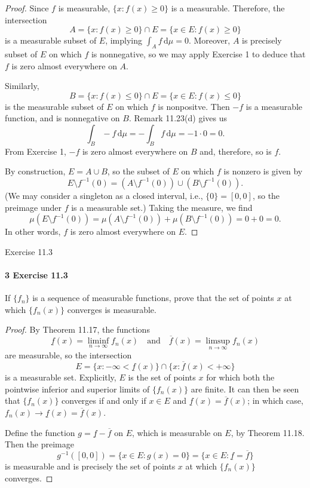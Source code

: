 \documentclass[12pt]{article}
\newenvironment{fullbox}{\begin{lrbox}{\savefullbox}\begin{minipage}{\dimexpr\textwidth-2\fboxsep\relax}}{\end{minipage}\end{lrbox}\begin{center}\framebox[\textwidth]{\usebox{\savefullbox}}\end{center}}
\newenvironment{pbox}[1][]{\begin{fullbox}\ifx#1\empty\else\paragraph{#1}\fi}{\end{fullbox}}
\newcommand{\isp}[1]{\quad\text{#1}\quad}
\newcommand{\<}{\langle}
\renewcommand{\>}{\rangle}
\newcommand{\dd}[1]{\,\mathrm{d}#1}
\newcommand{\of}[1]{\!\left(#1\right)}
\begin{document}
\begin{proof}
    Since $f$ is measurable, $\{x : f(x) \geq 0\}$ is a measurable. Therefore, the intersection
    \[
        A = \{x : f(x) \geq 0\} \cap E = \{x \in E : f(x) \geq 0\}
    \]
    is a measurable subset of $E$, implying $\int_A f \dd{\mu} = 0$. Moreover, $A$ is precisely subset of $E$ on which $f$ is nonnegative, so we may apply Exercise 1 to deduce that $f$ is zero almost everywhere on $A$.

    Similarly,
    \[
        B = \{x : f(x) \leq 0\} \cap E = \{x \in E : f(x) \leq 0\}
    \]
    is the measurable subset of $E$ on which $f$ is nonpositve. Then $-f$ is a measurable function, and is nonnegative on $B$. Remark 11.23(d) gives us
    \[
        \int_B -f \dd{\mu} = - \int_B f \dd{\mu} = -1 \cdot 0 = 0.
    \]
    From Exercise 1, $-f$ is zero almost everywhere on $B$ and, therefore, so is $f$. 
    
    By construction, $E = A \cup B$, so the subset of $E$ on which $f$ is nonzero is given by
    \[
        E \setminus f^{-1}(0) = (A \setminus f^{-1}(0)) \cup (B \setminus f^{-1}(0)).
    \]
    (We may consider a singleton as a closed interval, i.e., $\{0\} = [0, 0]$, so the preimage under $f$ is a measurable set.) Taking the measure, we find
    \[
        \mu\of{E \setminus f^{-1}(0)}
            = \mu\of{A \setminus f^{-1}(0)} + \mu\of{B \setminus f^{-1}(0)}
            = 0 + 0
            = 0.
    \]
    In other words, $f$ is zero almost everywhere on $E$.

\end{proof}


\newpage
\begin{pbox}[3 Exercise 11.3]
    If $\{f_n\}$ is a sequence of measurable functions, prove that the set of points $x$ at which $\{f_n(x)\}$ converges is measurable.
\end{pbox}

\begin{proof}
    By Theorem 11.17, the functions
    \[
        \underline{f}(x) = \liminf_{n \to \infty} f_n(x)
        \isp{and}    
        \overline{f}(x) = \limsup_{n \to \infty} f_n(x) 
    \]
    are measurable, so the intersection 
    \[
        E = \{x : -\infty < \underline{f}(x)\} \cap \{x : \overline{f}(x) < +\infty\}
    \]
    is a measurable set. Explicitly, $E$ is the set of points $x$ for which both the pointwise inferior and superior limits of $\{f_n(x)\}$ are finite. It can then be seen that $\{f_n(x)\}$ converges if and only if $x \in E$ and  $\underline{f}(x) = \overline{f}(x)$; in which case, $f_n(x) \to \underline{f}(x) = \overline{f}(x)$.

    Define the function $g = \underline{f} - \overline{f}$ on $E$, which is measurable on $E$, by Theorem 11.18. Then the preimage
    \[
        g^{-1}([0, 0]) = \{x \in E : g(x) = 0\} = \{x \in E : \underline{f} = \overline{f}\}
    \] 
    is measurable and is precisely the set of points $x$ at which $\{f_n(x)\}$ converges.

\end{proof}
\end{document}
